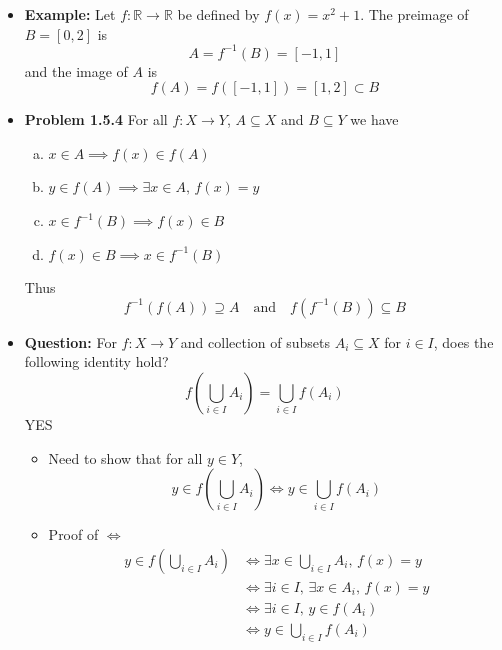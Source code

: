 \documentclass[11pt,twoside]{report}
\newcommand{\bbR}{{\mathbb{R}}}
\begin{document}
\begin{itemize}
\item \textbf{Example:} Let $f \colon \bbR \to \bbR$ be defined by $f(x) = x^2+1$. The preimage of $B = [0, 2]$ is 
\[
A = f^{-1}(B) = [-1,1]
\]
and the image  of $A$ is 
\[
f(A)  = f( [-1, 1]) =   [1,2] \subset B 
\]


\item \textbf{Problem 1.5.4} For all $f \colon X \to Y$, $A \subseteq X$ and $B \subseteq Y$ we have
\begin{enumerate}[(a)]
\item $x \in A \implies f(x) \in f(A)$
\item $y \in f(A) \implies \exists x \in A, \, f(x) = y$
\item $x \in f^{-1}(B) \implies f(x) \in B$%
\item $f(x) \in B \implies x \in f^{-1}(B)$%
\end{enumerate}
Thus 
\[
f^{-1}( f(A)) \supseteq A  \quad \text{and} \quad f( f^{-1}(B)) \subseteq B
\]


\item \textbf{Question:} For $f \colon X \to Y$ and collection of subsets $A_i \subseteq X$ for $i \in I$, 
does the following identity hold? 
\[
f\left(\bigcup_{i \in I} A_i \right)  = \bigcup_{i \in I} f(A_i) 
\]
YES
\begin{itemize}
\item Need to show that for all $y \in Y$, 
\[
y \in f\left(\bigcup_{i \in I} A_i \right)  \iff y  \in  \bigcup_{i \in I} f(A_i) 
\]

\item Proof of $\Longleftrightarrow$
\begin{align*}
y \in f\left(\bigcup_{i \in I} A_i \right) & \Longleftrightarrow  \exists  x  \in \bigcup_{i \in I} A_i, \, f(x)  = y\\
& \Longleftrightarrow \exists i \in I, \, \exists x \in A_i, \,  f(x) = y \\
& \Longleftrightarrow \exists i \in I, \,  y \in f(A_i) \\
& \Longleftrightarrow y \in \bigcup_{i \in I} f(A_i )
\end{align*}

\end{itemize}


\end{itemize}


 
\end{document}
